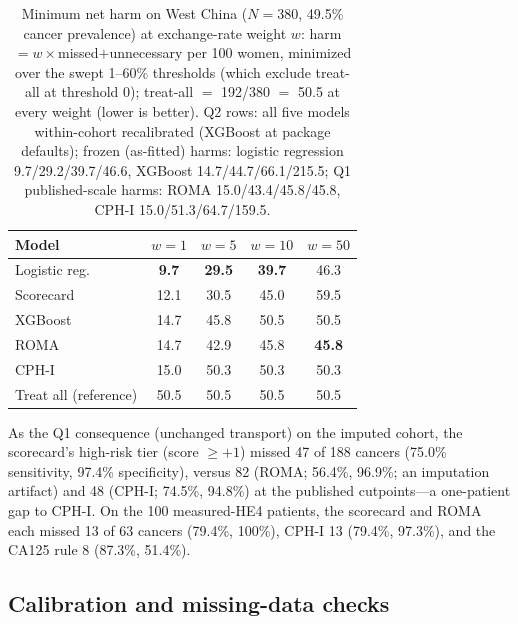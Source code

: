 \documentclass[conference]{IEEEtran}
\begin{document}
\begin{table}[!t]
\caption{Minimum net harm on West China ($N=380$, 49.5\% cancer
prevalence) at exchange-rate
weight $w$: harm $=w\times$missed$+$unnecessary per 100 women,
minimized over the swept 1--60\% thresholds (which exclude treat-all
at threshold 0); treat-all $=$ 192/380 $=$ 50.5
at every weight (lower is better). Q2 rows: all five models
within-cohort recalibrated (XGBoost at package defaults); frozen
(as-fitted) harms: logistic
regression 9.7/29.2/39.7/46.6, XGBoost 14.7/44.7/66.1/215.5; Q1
published-scale harms: ROMA 15.0/43.4/45.8/45.8, CPH-I
15.0/51.3/64.7/159.5.}
\label{tab:harm}
\centering
\begin{tabular}{lcccc}
\toprule
Model & $w{=}1$ & $w{=}5$ & $w{=}10$ & $w{=}50$\\
\midrule
Logistic reg. & \textbf{9.7} & \textbf{29.5} & \textbf{39.7} & 46.3\\
Scorecard & 12.1 & 30.5 & 45.0 & 59.5\\
XGBoost & 14.7 & 45.8 & 50.5 & 50.5\\
ROMA & 14.7 & 42.9 & 45.8 & \textbf{45.8}\\
CPH-I & 15.0 & 50.3 & 50.3 & 50.3\\
Treat all (reference) & 50.5 & 50.5 & 50.5 & 50.5\\
\bottomrule
\end{tabular}
\end{table}

As the Q1 consequence (unchanged transport) on the imputed
cohort, the
scorecard's high-risk tier (score $\ge +1$) missed 47 of 188 cancers
(75.0\% sensitivity, 97.4\% specificity), versus
82 (ROMA; 56.4\%, 96.9\%; an imputation artifact) and 48 (CPH-I; 74.5\%, 94.8\%) at the
published cutpoints---a one-patient gap to CPH-I.
On the 100 measured-HE4 patients, the scorecard and ROMA
each missed 13 of 63 cancers (79.4\%, 100\%), CPH-I 13 (79.4\%,
97.3\%), and the CA125
rule 8 (87.3\%, 51.4\%).

\subsection{Calibration and missing-data checks}
\label{sec:calibration}
\end{document}
